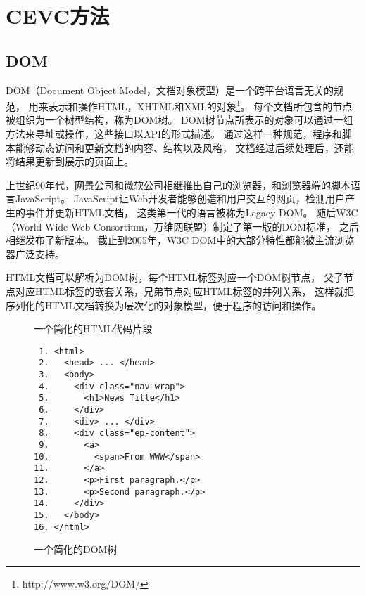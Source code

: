 \section{CEVC方法}
\label{sec:cevc-method}

\subsection{DOM}
DOM（Document Object Model，文档对象模型）是一个跨平台语言无关的规范，
用来表示和操作HTML，XHTML和XML的对象\footnote{http://www.w3.org/DOM/}。
每个文档所包含的节点被组织为一个树型结构，称为DOM树。
DOM树节点所表示的对象可以通过一组方法来寻址或操作，这些接口以API的形式描述。
通过这样一种规范，程序和脚本能够动态访问和更新文档的内容、结构以及风格，
文档经过后续处理后，还能将结果更新到展示的页面上。

上世纪90年代，网景公司和微软公司相继推出自己的浏览器，和浏览器端的脚本语言JavaScript。
JavaScript让Web开发者能够创造和用户交互的网页，检测用户产生的事件并更新HTML文档，
这类第一代的语言被称为Legacy DOM。
随后W3C（World Wide Web Consortium，万维网联盟）制定了第一版的DOM标准，
之后相继发布了新版本。
截止到2005年，W3C DOM中的大部分特性都能被主流浏览器广泛支持。

HTML文档可以解析为DOM树，每个HTML标签对应一个DOM树节点，
父子节点对应HTML标签的嵌套关系，兄弟节点对应HTML标签的并列关系，
这样就把序列化的HTML文档转换为层次化的对象模型，便于程序的访问和操作。

\begin{figure}[htbp]
\begin{example}
\label{ex:html}
一个简化的HTML代码片段
\end{example}
\begin{verbatim}
 1. <html>
 2.   <head> ... </head>
 3.   <body>
 4.     <div class="nav-wrap">
 5.       <h1>News Title</h1>
 6.     </div>
 7.     <div> ... </div>
 8.     <div class="ep-content">
 9.       <a>
10.         <span>From WWW</span>
11.       </a>
12.       <p>First paragraph.</p>
13.       <p>Second paragraph.</p>
14.     </div>
15.   </body>
16. </html>
\end{verbatim}
\end{figure}

\begin{figure}[htbp]
\centering
{}
\caption{一个简化的DOM树}
\label{fig:dom}
\end{figure}

